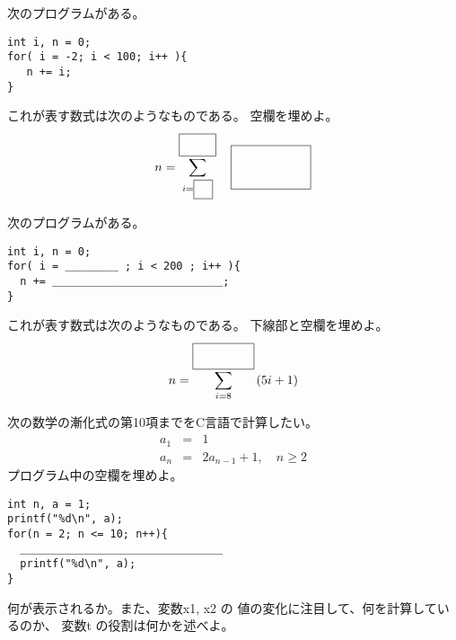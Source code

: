 \documentclass[12pt,a4j]{jarticle}
\def\an#1{}
\def\ds{\displaystyle}
\newcounter{toi}
\def\toi{%
\bigskip\bigskip\noindent
\addtocounter{toi}{1}
\shadowbox{\bfseries\large 問\thetoi}
\nopagebreak[4]\bigskip\nopagebreak[4]
}
\begin{document}




\toi


次のプログラムがある。
\begin{verbatim}
int i, n = 0;
for( i = -2; i < 100; i++ ){
   n += i;
}
\end{verbatim}
これが表す数式は次のようなものである。
空欄を埋めよ。
\[
 n = \sum_{i=\raisebox{.5mm}{\fbox{\hbox to .3cm{\rule[-1.5mm]{0mm}{3mm}}}}}^{\fbox{\hbox to .8cm{\rule[-4mm]{0mm}{3mm}}}}
 \quad\fbox{\hbox to 2cm{\rule[-4mm]{0mm}{10mm}}}
\]


\myanswer{
$\ds\sum_{i=-2}^{99} i$
}





\toi


次のプログラムがある。
\begin{verbatim}
int i, n = 0;
for( i = ＿＿＿＿＿ ; i < 200 ; i++ ){
  n += ＿＿＿＿＿＿＿＿＿＿＿＿＿＿＿＿;
}
\end{verbatim}


これが表す数式は次のようなものである。
下線部と空欄を埋めよ。
\[
 n = \sum_{i=8}^{\fbox{\hbox to 1.5cm{ \an{199} \rule[-1.5mm]{0mm}{5mm}}}}
 \left(5i+1\right)
\]







\toi
\label{toi:zenkasiki1}

次の数学の漸化式の第10項までをC言語で計算したい。
\begin{eqnarray*}
 a_1 &=& 1\\
 a_n &=& 2 a_{n-1} + 1, \quad n \ge 2
\end{eqnarray*}
プログラム中の空欄を埋めよ。
\begin{verbatim}
int n, a = 1;
printf("%d\n", a);
for(n = 2; n <= 10; n++){
  ＿＿＿＿＿＿＿＿＿＿＿＿＿＿＿＿＿＿＿
  printf("%d\n", a);
}
\end{verbatim}




\toi
\label{toi:zenkasiki2}

何が表示されるか。また、変数{\ttfamily x1, x2} の
値の変化に注目して、何を計算しているのか、
変数{\ttfamily t} の役割は何かを述べよ。
\end{document}
